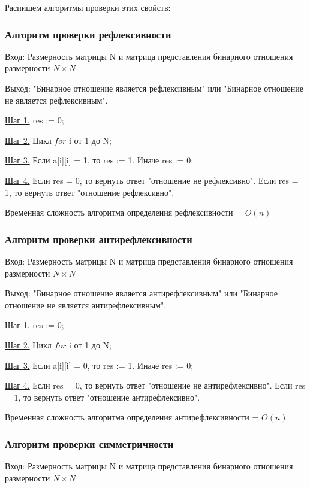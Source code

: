\documentclass[bachelor, och, labwork]{shiza}
\begin{document}
	Распишем алгоритмы проверки этих свойств:
	
	\subsubsection{Алгоритм проверки рефлексивности}
	
	$\textit{Вход:}$ Размерность матрицы N и матрица представления бинарного отношения размерности $N \times N$
	
	$\textit{Выход:}$  "Бинарное отношение является рефлексивным" или "Бинарное отношение не является рефлексивным".
	
	\underline{Шаг 1.} res := 0;
	
	\underline{Шаг 2.} Цикл $for$ i от 1 до N;
	
	\underline{Шаг 3.} Если a[i][i] = 1, то res := 1. Иначе res := 0;
	
	\underline{Шаг 4.} Если res = 0, то вернуть ответ "отношение не рефлексивно". Если res = 1, то вернуть ответ "отношение рефлексивно".
	
	Временная сложность алгоритма определения рефлексивности = $O(n)$
	
	\subsubsection{Алгоритм проверки антирефлексивности}

	$\textit{Вход:}$ Размерность матрицы N и матрица представления бинарного отношения размерности $N \times N$
	
	$\textit{Выход:}$  "Бинарное отношение является антирефлексивным" или "Бинарное отношение не является антирефлексивным".
	
	\underline{Шаг 1.} res := 0;

	\underline{Шаг 2.} Цикл $for$ i от 1 до N;
	
	\underline{Шаг 3.} Если a[i][i] = 0, то res := 1. Иначе res := 0;
	
	\underline{Шаг 4.} Если res = 0, то вернуть ответ "отношение не антирефлексивно". Если res = 1, то вернуть ответ "отношение антирефлексивно".
	
	Временная сложность алгоритма определения антирефлексивности = $O(n)$
		
	\subsubsection{Алгоритм проверки симметричности}
	
	$\textit{Вход:}$ Размерность матрицы N и матрица представления бинарного отношения размерности $N \times N$
	
\end{document}
